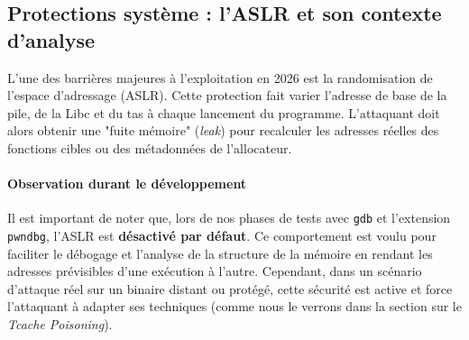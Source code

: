 \subsection{Protections système : l'ASLR et son contexte d'analyse}
L'une des barrières majeures à l'exploitation en 2026 est la randomisation de l'espace d'adressage (ASLR). Cette protection fait varier l'adresse de base de la pile, de la Libc et du tas à chaque lancement du programme. L'attaquant doit alors obtenir une "fuite mémoire" (\textit{leak}) pour recalculer les adresses réelles des fonctions cibles ou des métadonnées de l'allocateur.

\paragraph{Observation durant le développement}
Il est important de noter que, lors de nos phases de tests avec \texttt{gdb} et l'extension \texttt{pwndbg}, l'ASLR est \textbf{désactivé par défaut}. Ce comportement est voulu pour faciliter le débogage et l'analyse de la structure de la mémoire en rendant les adresses prévisibles d'une exécution à l'autre. Cependant, dans un scénario d'attaque réel sur un binaire distant ou protégé, cette sécurité est active et force l'attaquant à adapter ses techniques (comme nous le verrons dans la section sur le \textit{Tcache Poisoning}).